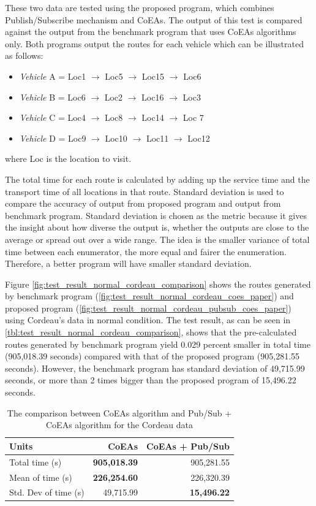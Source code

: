 \documentclass[conference]{IEEEtran}
\newcommand{\ra}[1]{\renewcommand{\arraystretch}{#1}}
\begin{document}
These two data are tested using the proposed program, which combines Publish/Subscribe mechanism and CoEAs. The output of this test is compared against the output from the benchmark program that uses CoEAs algorithms only. Both programs output the routes for each vehicle which can be illustrated as follows:

\begin{itemize}
\item \textit{Vehicle} A = Loc1 $\rightarrow$ Loc5 $\rightarrow$ Loc15 $\rightarrow$ Loc6
\item \textit{Vehicle} B = Loc6 $\rightarrow$ Loc2 $\rightarrow$ Loc16 $\rightarrow$ Loc3
\item \textit{Vehicle} C = Loc4 $\rightarrow$ Loc8 $\rightarrow$ Loc14 $\rightarrow$ Loc 7
\item \textit{Vehicle} D = Loc9 $\rightarrow$ Loc10 $\rightarrow$ Loc11 $\rightarrow$ Loc12
\end{itemize}
where Loc is the location to visit. 

The total time for each route is calculated by adding up the service time and the transport time of all locations in that route. Standard deviation is used to compare the accuracy of output from proposed program and output from benchmark program. Standard deviation is chosen as the metric because it gives the insight about how diverse the output is, whether the outputs are close to the average or spread out over a wide range. The idea is the smaller variance of total time between each enumerator, the more equal and fairer the enumeration. Therefore, a better program will have smaller standard deviation.

Figure \autoref{fig:test_result_normal_cordeau_comparison} shows the routes generated by benchmark program (\autoref{fig:test_result_normal_cordeau_coes_paper}) and proposed program (\autoref{fig:test_result_normal_cordeau_pubsub_coes_paper}) using Cordeau's data in normal condition. The test result, as can be seen in \autoref{tbl:test_result_normal_cordeau_comparison}, shows that the pre-calculated routes generated by benchmark program yield 0.029 percent smaller in total time (905,018.39 seconds) compared with that of the proposed program (905,281.55 seconds). However, the benchmark program has standard deviation of 49,715.99 seconds, or more than 2 times bigger than the proposed program of 15,496.22 seconds. 

\begin{table}[!]
	\centering
	\ra{1.3}
	\caption{The comparison between CoEAs algorithm and Pub/Sub + CoEAs algorithm for the Cordeau data}
	\label{tbl:test_result_normal_cordeau_comparison}
	\begin{tabular}{lrr}
		\toprule
		Units & CoEAs & CoEAs + Pub/Sub\\ 
		\midrule
		Total time (s) & \textbf{905,018.39} & 905,281.55\\
		Mean of time (s) & \textbf{226,254.60} & 226,320.39\\
		Std. Dev of time (s) & 49,715.99 & \textbf{15,496.22}\\
		\bottomrule
	\end{tabular}
\end{table}
\end{document}
